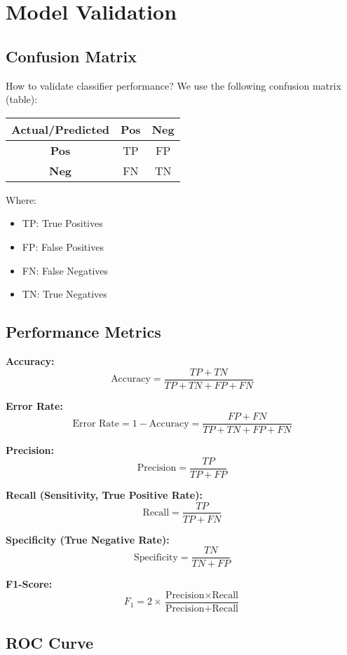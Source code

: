 \section*{Model Validation}

\subsection*{Confusion Matrix}

How to validate classifier performance? We use the following confusion matrix (table):

\begin{center}
\begin{tabular}{|c|c|c|}
\hline
\textbf{Actual/Predicted} & \textbf{Pos} & \textbf{Neg} \\ \hline
\textbf{Pos} & TP & FP \\ \hline
\textbf{Neg} & FN & TN \\ \hline
\end{tabular}
\end{center}

Where:
\begin{itemize}
    \item TP: True Positives
    \item FP: False Positives
    \item FN: False Negatives
    \item TN: True Negatives
\end{itemize}

\subsection*{Performance Metrics}

\textbf{Accuracy:} 
$$\text{Accuracy} = \frac{TP + TN}{TP + TN + FP + FN}$$

\textbf{Error Rate:}
$$\text{Error Rate} = 1 - \text{Accuracy} = \frac{FP + FN}{TP + TN + FP + FN}$$

\textbf{Precision:} 
$$\text{Precision} = \frac{TP}{TP + FP}$$

\textbf{Recall (Sensitivity, True Positive Rate):}
$$\text{Recall} = \frac{TP}{TP + FN}$$

\textbf{Specificity (True Negative Rate):}
$$\text{Specificity} = \frac{TN}{TN + FP}$$

\textbf{F1-Score:}
$$F_1 = 2 \times \frac{\text{Precision} \times \text{Recall}}{\text{Precision} + \text{Recall}}$$

\subsection*{ROC Curve}

